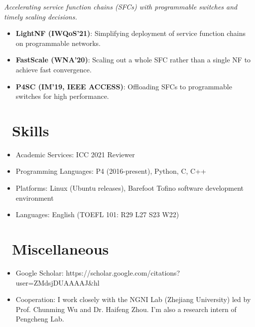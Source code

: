 \documentclass{resume}
\begin{document}
\emph{Accelerating service function chains (SFCs) with programmable switches and timely scaling decisions.}
\begin{itemize}
  \item \textbf{LightNF (IWQoS'21)}: Simplifying deployment of service function chains on programmable networks. 
  \item \textbf{FastScale (WNA'20)}: Scaling out a whole SFC rather than a single NF to achieve fast convergence. 
  \item \textbf{P4SC (IM'19, IEEE ACCESS)}: Offloading SFCs to programmable switches for high performance.
\end{itemize}


\section{\faCogs\ Skills}
\begin{itemize}[parsep=0.5ex]
  \item Academic Services: ICC 2021 Reviewer
  \item Programming Languages: P4 (2016-present), Python, C, C++
  \item Platforms: Linux (Ubuntu releases), Barefoot Tofino software development environment
  \item Languages: English (TOEFL 101: R29 L27 S23 W22)
\end{itemize}


\section{\faInfo\ Miscellaneous}
\begin{itemize}[parsep=0.5ex]
  \item Google Scholar: https://scholar.google.com/citations?user=ZMdsjDUAAAAJ\&hl
  \item Cooperation: I work closely with the NGNI Lab (Zhejiang University) led by Prof. Chunming Wu and Dr. Haifeng Zhou. I'm also a research intern of Pengcheng Lab.
\end{itemize}

%
%
\end{document}
